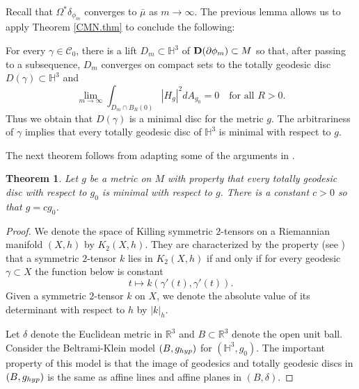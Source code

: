 \documentclass[11pt]{amsart}
\def\R{\mathbb R}
\def\H{\mathbb H}
\newtheorem{thm}{Theorem}[section]
\theoremstyle{remark}
\theoremstyle{definition}
\begin{document}
{{	Recall that $\Omega^*\delta_{\phi_m}$ converges to ${\bar \mu}$ as $m\to\infty$.  The previous lemma allows us to apply Theorem \ref{CMN.thm} to  conclude  the following:
	
	For every $\gamma\in\mathcal C_0$, there is a lift $D_m\subset \H^3$  of ${\bf D}(\partial\phi_m)\subset M$ so that, after passing to a subsequence, 
	$D_m$  converges on compact sets to the totally geodesic disc $D(\gamma)\subset \H^3$ and
	$$
	\lim_{m\to\infty}\int_{D_m\cap B_R(0)}|H_g|^2dA_{g_0}=0\quad\mbox{for all }R>0.
	$$
	Thus we obtain that $D(\gamma)$ is a minimal disc for the metric $g$. The arbitrariness of $\gamma$ implies that every totally geodesic disc of $\H^3$ is minimal with respect to $g$. 
	
	The next theorem follows from adapting some of the arguments  in \cite{amb-marques-neves}. 
	\begin{thm} Let $g$ be a metric on $M$ with property that every totally geodesic disc with respect to $g_0$ is minimal with respect to $g$. There is a constant   $c>0$ so that $g=cg_0$.
	\end{thm}
	\begin{proof}
		
		
		We denote the space of Killing symmetric $2$-tensors on a Riemannian manifold $(X,h)$ by $ K_2(X,h)$. They are characterized by the property (see \cite[Section 1]{Tak}) that a symmetric $2$-tensor $k$ lies in $K_2(X,h)$ if and only if for every geodesic $\gamma \subset X$ the  function below is constant
		$$t\mapsto k(\gamma'(t),\gamma'(t)).$$
		Given a symmetric $2$-tensor $k$ on $X$, we denote the absolute value of its determinant with respect to $h$ by $|k|_h$.
		
		Let $\delta$ denote the Euclidean metric in $\R^3$ and $B\subset \R^3$ denote the open unit ball. Consider the Beltrami-Klein model $(B,g_{\rm hyp})$ for $(\H^3,g_0)$. The important property of this model is that the image of geodesics and totally geodesic discs in $(B,g_{\rm hyp})$  is the same as affine lines and affine planes in $(B,\delta).$  
		

\end{proof}}}
\end{document}
